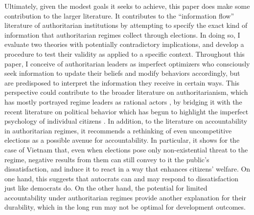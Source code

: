 \documentclass[12pt]{article}\usepackage[]{graphicx}\usepackage[]{color}
\newcommand{\1}{\mathbbm{1}}
\begin{document}
Ultimately, given the modest goals it seeks to achieve, this paper does make some contribution to the larger literature. It contributes to the ``information flow'' literature of authoritarian institutions by attempting to specify the exact kind of information that authoritarian regimes collect through elections. In doing so, I evaluate two theories with potentially contradictory implications, and develop a procedure to test their validity as applied to a specific context. Throughout this paper, I conceive of authoritarian leaders as imperfect optimizers who consciously seek information to update their beliefs and modify behaviors accordingly, but are predisposed to interpret the information they receive in certain ways. This perspective could contribute to the broader literature on authoritarianism, which has mostly portrayed regime leaders as rational actors \citep[e.g.][]{AR2001}, by bridging it with the recent literature on political behavior which has begun to highlight the imperfect psychology of individual citizens \citep[e.g.][]{AchenBartels2016}. In addition, to the literature on accountability in authoritarian regimes, it recommends a rethinking of even uncompetitive elections as a possible avenue for accountability. In particular, it shows for the case of Vietnam that, even when elections pose only non-existential threat to the regime, negative results from them can still convey to it the public's dissatisfaction, and induce it to react in a way that enhances citizens' welfare. On one hand, this suggests that autocrats can and may respond to dissatisfaction just like democrats do. On the other hand, the potential for limited accountability under authoritarian regimes provide another explanation for their durability, which in the long run may not be optimal for development outcomes.



\newpage
\appendix
\end{document}
